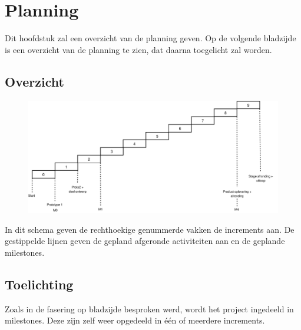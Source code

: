 \section{Planning}

Dit hoofdstuk zal een overzicht van de planning geven. Op de volgende bladzijde is een overzicht van de planning te zien, dat daarna toegelicht zal worden.

\begin{landscape}
\subsection{Overzicht}

\begin{figure}[h]
\includegraphics[width=20cm]{planning}
\end{figure}

In dit schema geven de rechthoekige genummerde vakken de increments aan. De gestippelde lijnen geven de gepland afgeronde activiteiten aan en de geplande milestones.

\end{landscape}

\newpage
\subsection{Toelichting}
\label{planning}

Zoals in de fasering op bladzijde \pageref{fasering} besproken werd, wordt het project ingedeeld in milestones. Deze zijn zelf weer opgedeeld in \'e\'en of meerdere increments.

